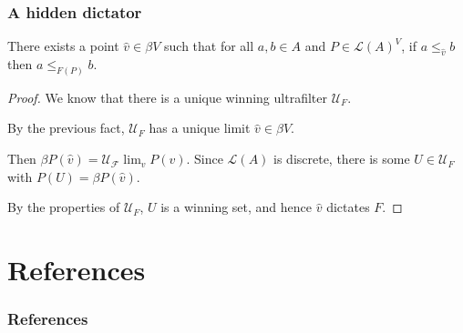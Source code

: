\documentclass{beamer}
\theoremstyle{definition}
\begin{document}
\begin{frame}
    \frametitle{A hidden dictator}

    \begin{theorem}
        There exists a point $\hat{v} \in \mathit{\beta V}$ such that for all $a, b \in A$ and $P \in \mathcal{L}(A)^V$, if $a \leq_{\hat{v}} b$
        then $a \leq_{F(P)} b$.
    \end{theorem}

    \begin{proof}
        \pause
        We know that there is a unique winning ultrafilter $\mathcal{U}_F$.

        \pause
        By the previous fact, $\mathcal{U}_F$ has a unique limit $\hat{v} \in \mathit{\beta V}$.
        
        \pause
        Then $\mathit{\beta P}(\hat{v}) = \mathcal{U_F}\lim_v P(v)$. Since $\mathcal{L}(A)$ is discrete, there is some
        $U \in \mathcal{U}_F$ with $P(U) = \mathit{\beta P}(\hat{v})$.
        
        \pause
        By the properties of $\mathcal{U}_F$, $U$ is a winning set, and hence $\hat{v}$ dictates $F$.
    \end{proof}

\end{frame}

\section{References}

\begin{frame}
    \frametitle{References}

    \nocite{*}
    \printbibliography

\end{frame}
\end{document}

